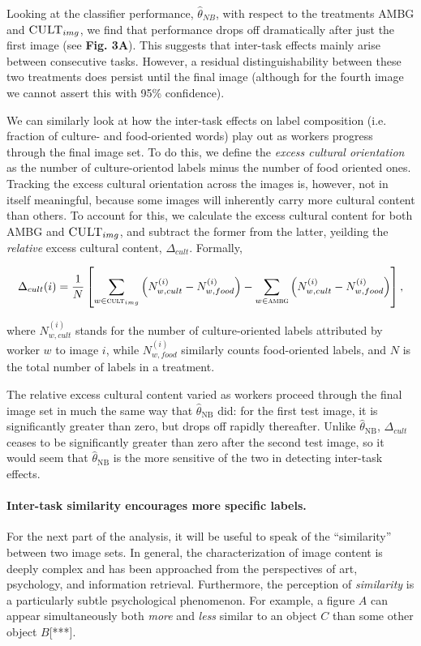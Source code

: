 \documentclass[a4paper]{report}
\begin{document}
Looking at the classifier performance, $\hat{\theta}_{NB}$, with respect to the
treatments \textsc{AMBG} and $\textsc{CULT}_{img}$, we find that performance
drops off dramatically after just the first image (see \textbf{Fig. 3A}).
This suggests that inter-task effects mainly arise between consecutive tasks.
However, a residual distinguishability between these two treatments does 
persist until the final image (although for the fourth image we cannot assert
this with 95\% confidence).

We can similarly look at how the inter-task effects on label composition
(i.e. fraction of culture- and food-oriented words) play out as workers 
progress through the final image set.  To do this, we define the 
\textit{excess cultural orientation} as the number of culture-orientod labels 
minus the number of food oriented ones.  Tracking the excess cultural 
orientation across the images is, however, not in itself meaningful,
because some images will inherently carry more cultural content than others. 
To account for this, we calculate the excess cultural content for both 
\textsc{AMBG} and $\textsc{CULT}_{img}$, and subtract the former from the 
latter, yeilding the \textit{relative} excess cultural content, 
$\Delta_{cult}$.  Formally,

\begin{align}
	\Delta_{cult}(i) = \frac{1}{N}\left[ \sum_{w\in\textsc{cult}_{img}} \left(N_{w,cult}^{(i)} - N_{w,food}^{(i)}\right)
	- \sum_{w\in\textsc{ambg}} \left(N_{w,cult}^{(i)} - N_{w,food}^{(i)}\right)\right],
\end{align}

where $N_{w,cult}^{(i)}$ stands for the number of culture-oriented labels 
attributed by worker $w$ to image $i$, while $N_{w,food}^{(i)}$ similarly 
counts food-oriented labels, and $N$ is the total number of labels in a 
treatment.  

The relative excess cultural content varied as workers proceed through the
final image set in much the same way that $\hat{\theta}_\text{NB}$ did: for the
first test image, it is significantly greater than zero, but drops off rapidly
thereafter.  Unlike $\hat{\theta}_\text{NB}$, $\Delta_{cult}$ ceases to
be significantly greater than zero after the second test image, so it would 
seem that $\hat{\theta}_\text{NB}$ is the more sensitive of the two in
detecting inter-task effects.

\paragraph{Inter-task similarity encourages more specific labels.}
For the next part of the analysis, it will be useful to speak of the
``similarity'' between two image sets. In general, the characterization of 
image content 
is deeply complex and has been approached from the perspectives of 
art\cite{panofsky1939studies,shatford1986analyzing},
psychology\cite{Tversky1977327}, and information retrieval\cite{Jaimes20002}.
Furthermore, the perception of \textit{similarity} is a particularly subtle 
psychological phenomenon.  For example, a figure $A$ can appear simultaneously
both \textit{more} and \textit{less} similar to an object $C$ than some other 
object $B$[***].    
\end{document}
